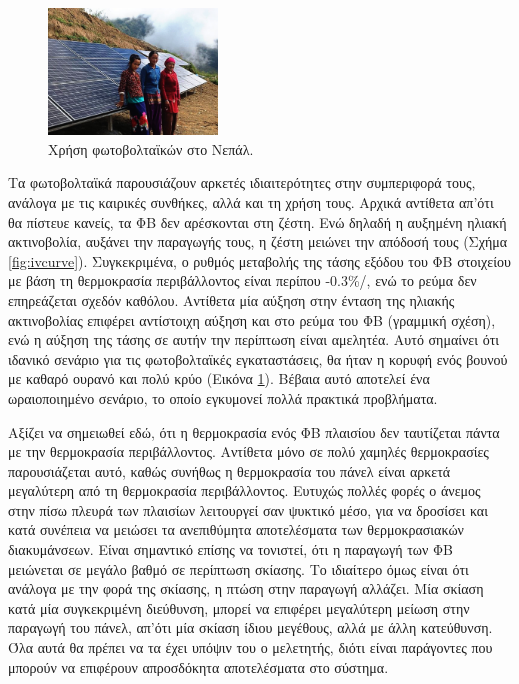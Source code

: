 \documentclass[12pt]{report}
\begin{document}
\begin{figure}
				\includegraphics[width=0.4\textwidth]{nepal}
				\captionsetup{name=Εικόνα}
				\caption{Χρήση φωτοβολταϊκών στο Νεπάλ.}
				\label{fig:nepal}
\end{figure}

Τα φωτοβολταϊκά παρουσιάζουν αρκετές ιδιαιτερότητες στην συμπεριφορά τους, ανάλογα με τις καιρικές συνθήκες, αλλά και τη χρήση τους. Αρχικά αντίθετα απ'ότι θα πίστευε κανείς, τα ΦΒ δεν αρέσκονται στη ζέστη. Ενώ δηλαδή η αυξημένη 
ηλιακή ακτινοβολία, αυξάνει την παραγωγής τους, η ζέστη μειώνει την απόδοσή τους (Σχήμα \ref{fig:ivcurve}). Συγκεκριμένα, ο ρυθμός μεταβολής της τάσης εξόδου του ΦΒ στοιχείου με βάση τη θερμοκρασία περιβάλλοντος είναι περίπου 
-0.3\%/{}, ενώ το ρεύμα δεν επηρεάζεται σχεδόν καθόλου. Αντίθετα μία αύξηση στην ένταση της ηλιακής ακτινοβολίας επιφέρει αντίστοιχη αύξηση και στο ρεύμα του ΦΒ (γραμμική σχέση), ενώ η αύξηση της τάσης σε αυτήν την 
περίπτωση είναι αμελητέα. Αυτό σημαίνει ότι ιδανικό σενάριο για τις φωτοβολταϊκές εγκαταστάσεις, θα ήταν η κορυφή ενός βουνού με καθαρό ουρανό και πολύ κρύο (Εικόνα \ref{fig:nepal}). Βέβαια αυτό αποτελεί ένα ωραιοποιημένο σενάριο, 
το οποίο εγκυμονεί πολλά πρακτικά προβλήματα. 

Αξίζει να σημειωθεί εδώ, ότι η θερμοκρασία ενός ΦΒ πλαισίου δεν ταυτίζεται πάντα με την θερμοκρασία περιβάλλοντος. Αντίθετα μόνο σε πολύ χαμηλές θερμοκρασίες παρουσιάζεται αυτό, καθώς συνήθως η θερμοκρασία του πάνελ είναι αρκετά 
μεγαλύτερη από τη θερμοκρασία περιβάλλοντος. Ευτυχώς πολλές φορές ο άνεμος στην πίσω πλευρά των πλαισίων λειτουργεί σαν ψυκτικό μέσο, για να δροσίσει και κατά συνέπεια να μειώσει τα ανεπιθύμητα αποτελέσματα των θερμοκρασιακών 
διακυμάνσεων. Είναι σημαντικό επίσης να τονιστεί, ότι η παραγωγή των ΦΒ μειώνεται σε μεγάλο βαθμό σε περίπτωση σκίασης. Το ιδιαίτερο όμως είναι ότι ανάλογα με την φορά της σκίασης, η πτώση στην παραγωγή αλλάζει. Μία σκίαση κατά μία 
συγκεκριμένη διεύθυνση, μπορεί να επιφέρει μεγαλύτερη μείωση στην παραγωγή του πάνελ, απ'ότι μία σκίαση ίδιου μεγέθους, αλλά με άλλη κατεύθυνση. Όλα αυτά θα πρέπει να τα έχει υπόψιν του ο μελετητής, διότι είναι παράγοντες που μπορούν
να επιφέρουν απροσδόκητα αποτελέσματα στο σύστημα. 
\end{document}
